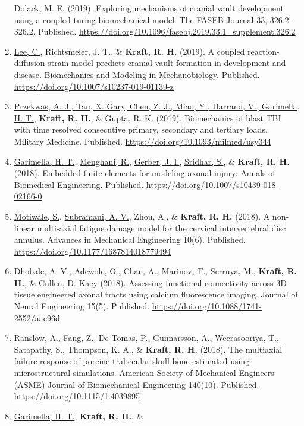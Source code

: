 \documentclass[a4paper,10pt]{article}
\begin{document}
\begin{enumerate}
 \underline{Dolack, M. E.} (2019). Exploring mechanisms of cranial vault development using a coupled turing-biomechanical model. The FASEB Journal 33, 326.2-326.2. Published. \url{https://doi.org/10.1096/fasebj.2019.33.1_supplement.326.2}
 \item	\underline{Lee, C.}, Richtsmeier, J. T., \&
 \textbf{\textbf{Kraft,} R. H.} (2019). A coupled reaction-diffusion-strain model predicts cranial vault formation in development and disease. Biomechanics and Modeling in Mechanobiology. Published. \url{https://doi.org/10.1007/s10237-019-01139-z}
 \item	\underline{Przekwas, A. J., Tan, X. Gary, Chen, Z. J., Miao, Y., Harrand, V., Garimella, H. T.}, \textbf{\textbf{Kraft,} R. H.}, \&
 Gupta, R. K. (2019). Biomechanics of blast TBI with time resolved consecutive primary, secondary and tertiary loads. Military Medicine. Published. \url{https://doi.org/10.1093/milmed/usy344}
 \item	\underline{Garimella, H. T.}, \underline{Menghani, R.}, \underline{Gerber, J. I.}, \underline{Sridhar, S.}, \&
 \textbf{\textbf{Kraft,} R. H.} (2018). Embedded finite elements for modeling axonal injury. Annals of Biomedical Engineering. Published. \url{https://doi.org/10.1007/s10439-018-02166-0}
 \item	\underline{Motiwale, S.}, \underline{Subramani, A. V.}, Zhou, A., \&
 \textbf{\textbf{Kraft,} R. H.} (2018). A non-linear multi-axial fatigue damage model for the cervical intervertebral disc annulus. Advances in Mechanical Engineering 10(6). Published. \url{https://doi.org/10.1177/1687814018779494}
 \item	\underline{Dhobale, A. V.}, \underline{Adewole, O., Chan, A., Marinov, T.}, Serruya, M., \textbf{\textbf{Kraft,} R. H.}, \&
 Cullen, D. Kacy (2018). Assessing functional connectivity across 3D tissue engineered axonal tracts using calcium fluorescence imaging. Journal of Neural Engineering 15(5). Published. \url{https://doi.org/10.1088/1741-2552/aac96d}
 \item	\underline{Ranslow, A.}, \underline{Fang, Z.}, \underline{De Tomas, P.}, Gunnarsson, A., Weerasooriya, T., Satapathy, S., Thompson, K. A., \&
 \textbf{\textbf{Kraft,} R. H.} (2018). The multiaxial failure response of porcine trabecular skull bone estimated using microstructural simulations. American Society of Mechanical Engineers (ASME) Journal of Biomechanical Engineering 140(10). Published. \url{https://doi.org/10.1115/1.4039895}
 \item	\underline{Garimella, H. T.}, \textbf{\textbf{Kraft,} R. H.}, \&

\end{enumerate}
\end{document}
